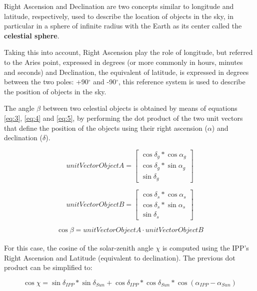 Right Ascension and Declination are two concepts similar to longitude and latitude, respectively, used to describe the location of objects in the sky, in particular in a sphere of infinite radius with the Earth as its center called the \textbf{celestial sphere}.

Taking this into account, Right Ascension play the role of longitude, but referred to the Aries point, expressed in degrees (or more commonly in hours, minutes and seconds) and Declination, the equivalent of latitude, is expressed in degrees between the two poles: +90$^{\circ}$ and -90$^{\circ}$, this reference system is used to describe the position of objects in the sky. \cite{nasareferencesystem}

The angle $\beta$ between two celestial objects is obtained by means of equations \ref{eq:3}, \ref{eq:4} and \ref{eq:5}, by performing the dot product of the two unit vectors that define the position of the objects using their right ascension ($\alpha$) and declination ($\delta$).

\begin{equation} \label{eq:3}
unitVectorObjectA =	
\begin{bmatrix}
\cos\delta_{g} * \cos\alpha_{g} \\ 
\cos\delta_{g} * \sin\alpha_{g} \\
\sin\delta_{g}
\end{bmatrix}
\end{equation}

\begin{equation} \label{eq:4}
unitVectorObjectB =	
\begin{bmatrix}
\cos\delta_{s} * \cos\alpha_{s} \\ 
\cos\delta_{s} * \sin\alpha_{s} \\
\sin\delta_{s}
\end{bmatrix}
\end{equation}

\begin{equation} \label{eq:5}
\cos \beta = unitVectorObjectA \cdot unitVectorObjectB
\end{equation}\\

For this case, the cosine of the solar-zenith angle $\chi$ is computed using the IPP's Right Ascension and Latitude (equivalent to declination). The previous dot product can be simplified to:

\begin{equation} \label{eq:6}
\cos \chi = \sin\delta_{IPP}*\sin\delta_{Sun} + \cos\delta_{IPP}*\cos\delta_{Sun}*\cos(\alpha_{IPP} - \alpha_{Sun})
\end{equation}\\


